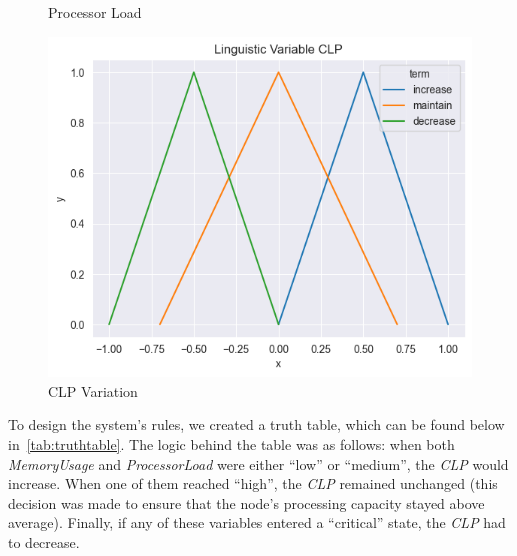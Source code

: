 \documentclass[titlepage]{article}
\begin{document}
\begin{figure}[htbp]
\begin{minipage}{0.32\textwidth}
        \caption{Processor Load}
        \label{fig:memory_usage}
    \end{minipage}
    \hfill
    \begin{minipage}{0.32\textwidth}
        \centering
        \includegraphics[width=\textwidth]{../images/triangular_CLP}
        \caption{CLP Variation}
        \label{fig:clp}
    \end{minipage}
\end{figure}


To design the system's rules, we created a truth table, which can be found below in~\vref{tab:truthtable}.
The logic behind the table was as follows: when both \textit{MemoryUsage} and \textit{ProcessorLoad} were either ``low'' or ``medium'', the \textit{CLP} would increase.
When one of them reached ``high'', the \textit{CLP} remained unchanged (this decision was made to ensure that the node's processing capacity stayed above average).
Finally, if any of these variables entered a ``critical'' state, the \textit{CLP} had to decrease.
\end{document}
